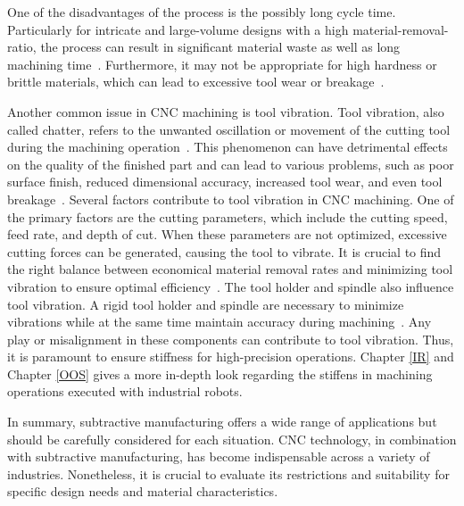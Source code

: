 One of the disadvantages of the process is the possibly long cycle time. Particularly for intricate and large-volume designs with a high material-removal-ratio, the process can result in significant material waste as well as long machining time~\cite{Faludi.2015}. Furthermore, it may not be appropriate for high hardness or brittle materials, which can lead to excessive tool wear or breakage~\cite{Hesser.2019}. 

Another common issue in \acrshort{CNC} machining is tool vibration. Tool vibration, also called chatter, refers to the unwanted oscillation or movement of the cutting tool during the machining operation~\cite{YUE.2019}. This phenomenon can have detrimental effects on the quality of the finished part and can lead to various problems, such as poor surface finish, reduced dimensional accuracy, increased tool wear, and even tool breakage~\cite{Aslan.2018}. Several factors contribute to tool vibration in \acrshort{CNC} machining. One of the primary factors are the cutting parameters, which include the cutting speed, feed rate, and depth of cut. When these parameters are not optimized, excessive cutting forces can be generated, causing the tool to vibrate. It is crucial to find the right balance between economical material removal rates and minimizing tool vibration to ensure optimal efficiency~\cite{GiorgioBort.2016}.
The tool holder and spindle also influence tool vibration. A rigid tool holder and spindle are necessary to minimize vibrations while at the same time maintain accuracy during machining~\cite{Wan.2019}. Any play or misalignment in these components can contribute to tool vibration. %
Thus, it is paramount to ensure stiffness for high-precision operations.
Chapter \ref{IR} and Chapter \ref{OOS} gives a more in-depth look regarding the stiffens in machining operations executed with industrial robots.

In summary, subtractive manufacturing offers a wide range of applications but should be carefully considered for each situation. CNC technology, in combination with subtractive manufacturing, has become indispensable across a variety of industries. Nonetheless, it is crucial to evaluate its restrictions and suitability for specific design needs and material characteristics.

